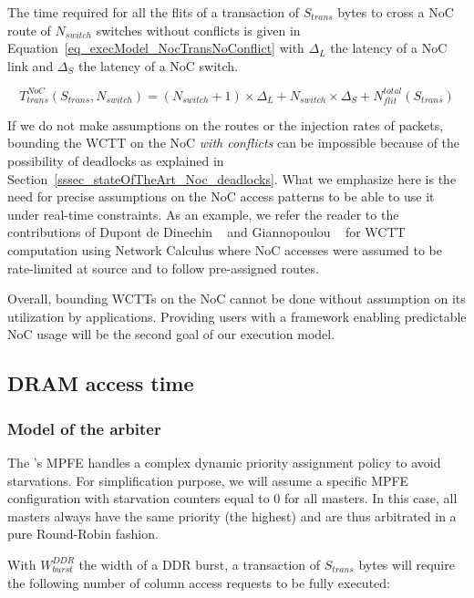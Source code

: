 \documentclass[main.tex]{subfiles}
\begin{document}
The time required for all the flits of a transaction of $S_{trans}$ bytes to
cross a NoC route of $N_{switch}$ switches without conflicts is given in
Equation~\ref{eq_execModel_NocTransNoConflict} with $\Delta_L$ the latency of a
NoC link and $\Delta_S$ the latency of a NoC switch.

\begin{equation}
    T_{trans}^{NoC} (S_{trans} , N_{switch}) = 
    (N_{switch} + 1) \times \Delta_L +
    N_{switch}  \times \Delta_S +
    N_{flit}^{total} ( S_{trans} )
    \label{eq_execModel_NocTransNoConflict}
\end{equation}

If we do not make assumptions on the routes or the injection rates of packets,
bounding the WCTT on the NoC \emph{with conflicts} can be impossible because of
the possibility of deadlocks as explained in
Section~\ref{sssec_stateOfTheArt_Noc_deadlocks}. What we emphasize here is the
need for precise assumptions on the NoC access patterns to be able to use it
under real-time constraints.  As an example, we refer the reader to the
contributions of Dupont de Dinechin \etal~\cite{Dinechin2014} and Giannopoulou
\etal~\cite{Giannopoulou2015} for WCTT computation using Network Calculus where
NoC accesses were assumed to be rate-limited at source and to follow
pre-assigned routes.

Overall, bounding WCTTs on the NoC cannot be done without assumption on its
utilization by applications. Providing users with a framework enabling
predictable NoC usage will be the second goal of our execution model.

\subsection{DRAM access time}
\label{ssec_execModel_DRAMaccessTime}
\subsubsection{Model of the arbiter}

The \mppalong's MPFE handles a complex dynamic priority assignment policy to
avoid starvations. For simplification purpose, we will assume a specific MPFE
configuration with starvation counters equal to 0 for all masters. In this
case, all masters always have the same priority (the highest) and are thus
arbitrated in a pure Round-Robin fashion.

With $W_{burst}^{DDR}$ the width of a DDR burst, a transaction of $S_{trans}$
bytes will require the following number of column access requests to be fully
executed:
\end{document}
